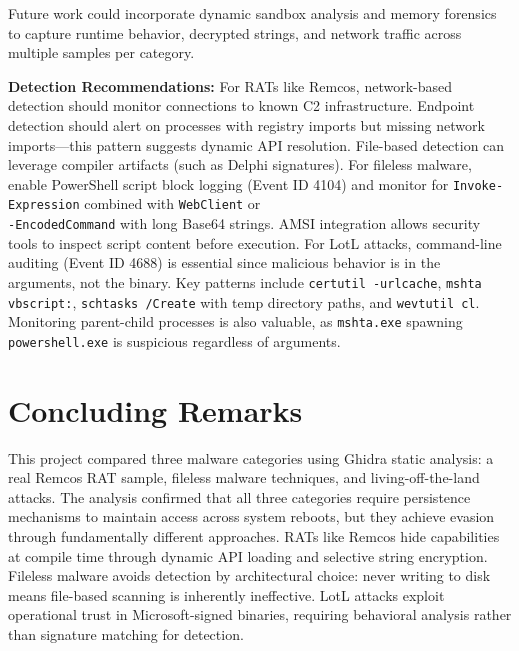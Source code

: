 \documentclass[sigconf]{acmart}
\begin{document}
\qquad Future work could incorporate dynamic sandbox analysis and memory forensics to capture runtime behavior, decrypted strings, and network traffic across multiple samples per category.

\qquad \textbf{Detection Recommendations:} For RATs like Remcos, network-based detection should monitor connections to known C2 infrastructure. Endpoint detection should alert on processes with registry imports but missing network imports---this pattern suggests dynamic API resolution. File-based detection can leverage compiler artifacts (such as Delphi signatures). For fileless malware, enable PowerShell script block logging (Event ID 4104) and monitor for \texttt{Invoke-Expression} combined with \texttt{WebClient} or \\ \texttt{-EncodedCommand} with long Base64 strings. AMSI integration allows security tools to inspect script content before execution. For LotL attacks, command-line auditing (Event ID 4688) is essential since malicious behavior is in the arguments, not the binary. Key patterns include \texttt{certutil -urlcache}, \texttt{mshta vbscript:}, \texttt{schtasks /Create} with temp directory paths, and \texttt{wevtutil cl}. Monitoring parent-child processes is also valuable, as \texttt{mshta.exe} spawning \texttt{powershell.exe} is suspicious regardless of arguments.


\section{Concluding Remarks}

\vspace{0.5em}
\qquad This project compared three malware categories using Ghidra static analysis: a real Remcos RAT sample, fileless malware techniques, and living-off-the-land attacks. The analysis confirmed that all three categories require persistence mechanisms to maintain access across system reboots, but they achieve evasion through fundamentally different approaches. RATs like Remcos hide capabilities at compile time through dynamic API loading and selective string encryption. Fileless malware avoids detection by architectural choice: never writing to disk means file-based scanning is inherently ineffective. LotL attacks exploit operational trust in Microsoft-signed binaries, requiring behavioral analysis rather than signature matching for detection.
\end{document}
